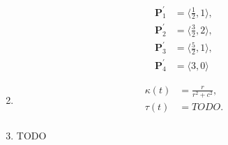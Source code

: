 \documentclass[a4paper]{report}
\begin{document}
\begin{enumerate}
\begin{align*}
			\mathbf{P}_1^{\prime} &= \langle \frac{1}{2}, 1 \rangle,\\
			\mathbf{P}_2^{\prime} &= \langle \frac{3}{2}, 2 \rangle,\\
			\mathbf{P}_3^{\prime} &= \langle \frac{5}{2}, 1 \rangle,\\
			\mathbf{P}_4^{\prime} &= \langle 3, 0 \rangle
		\end{align*}
	\item
		\begin{align*}
			\kappa(t) &= \frac{r}{r^2 + c^2},\\
			\tau(t) &= TODO.\\
		\end{align*}
	\item TODO
\end{enumerate}
\end{document}
